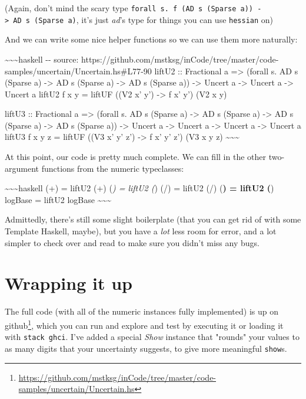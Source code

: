 \documentclass[]{article}
\renewcommand{\href}[2]{#2\footnote{\url{#1}}}
\begin{document}
(Again, don't mind the scary type
\texttt{forall\ s.\ f\ (AD\ s\ (Sparse\ a))\ -\textgreater{}\ AD\ s\ (Sparse\ a)},
it's just \emph{ad}'s type for things you can use
\texttt{hessian\textquotesingle{}} on)

And we can write some nice helper functions so we can use them more naturally:

\textasciitilde{}\textasciitilde{}\textasciitilde{}haskell -\/- source:
https://github.com/mstksg/inCode/tree/master/code-samples/uncertain/Uncertain.hs\#L77-90
liftU2 :: Fractional a =\textgreater{} (forall s. AD s (Sparse a)
-\textgreater{} AD s (Sparse a) -\textgreater{} AD s (Sparse a)) -\textgreater{}
Uncert a -\textgreater{} Uncert a -\textgreater{} Uncert a liftU2 f x y = liftUF
((V2 x' y') -\textgreater{} f x' y') (V2 x y)

liftU3 :: Fractional a =\textgreater{} (forall s. AD s (Sparse a)
-\textgreater{} AD s (Sparse a) -\textgreater{} AD s (Sparse a) -\textgreater{}
AD s (Sparse a)) -\textgreater{} Uncert a -\textgreater{} Uncert a
-\textgreater{} Uncert a -\textgreater{} Uncert a liftU3 f x y z = liftUF ((V3
x' y' z') -\textgreater{} f x' y' z') (V3 x y z)
\textasciitilde{}\textasciitilde{}\textasciitilde{}

At this point, our code is pretty much complete. We can fill in the other
two-argument functions from the numeric typeclasses:

\textasciitilde{}\textasciitilde{}\textasciitilde{}haskell (+) = liftU2 (+)
(\emph{) = liftU2 (}) (/) = liftU2 (/) (\textbf{) = liftU2 (}) logBase = liftU2
logBase \textasciitilde{}\textasciitilde{}\textasciitilde{}

Admittedly, there's still some slight boilerplate (that you can get rid of with
some Template Haskell, maybe), but you have a \emph{lot} less room for error,
and a lot simpler to check over and read to make sure you didn't miss any bugs.

\section{Wrapping it up}

The full code (with all of the numeric instances fully implemented) is up
\href{https://github.com/mstksg/inCode/tree/master/code-samples/uncertain/Uncertain.hs}{on
github}, which you can run and explore and test by executing it or loading it
with \texttt{stack\ ghci}. I've added a special \emph{Show} instance that
"rounds" your values to as many digits that your uncertainty suggests, to give
more meaningful \texttt{show}s.
\end{document}

